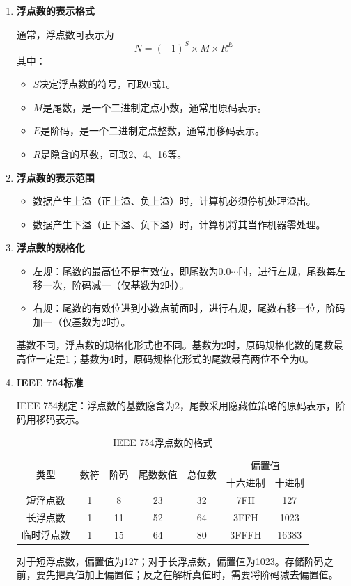 \documentclass[12pt, a4paper, oneside]{ctexart}
\begin{document}
\begin{enumerate}
  \item {\bf 浮点数的表示格式}
  
  通常，浮点数可表示为
  \begin{equation*}
    N=(-1)^S\times M\times R^E
  \end{equation*}
  其中：
  \begin{itemize}
    \item $S$决定浮点数的符号，可取0或1。
    \item $M$是尾数，是一个二进制定点小数，通常用原码表示。
    \item $E$是阶码，是一个二进制定点整数，通常用移码表示。
    \item $R$是隐含的基数，可取2、4、16等。
  \end{itemize}
  \item {\bf 浮点数的表示范围}
  
  \begin{itemize}
    \item 数据产生上溢（正上溢、负上溢）时，计算机必须停机处理溢出。
    \item 数据产生下溢（正下溢、负下溢）时，计算机将其当作机器零处理。
  \end{itemize}
  \item {\bf 浮点数的规格化}
  
  \begin{itemize}
    \item 左规：尾数的最高位不是有效位，即尾数为$0.0\cdots$时，进行左规，尾数每左移一次，阶码减一（仅基数为2时）。
    \item 右规：尾数的有效位进到小数点前面时，进行右规，尾数右移一位，阶码加一（仅基数为2时）。
  \end{itemize}

  基数不同，浮点数的规格化形式也不同。基数为2时，原码规格化数的尾数最高位一定是1；基数为4时，原码规格化形式的尾数最高两位不全为0。
  \item {\bf IEEE 754标准}
  
  IEEE 754规定：浮点数的基数隐含为2，尾数采用隐藏位策略的原码表示，阶码用移码表示。
  \begin{table}
    \centering
    \caption{IEEE 754浮点数的格式}
    \begin{tabular}{|c|c|c|c|c|c|c|}
      \hline
      \multirow{2}{*}{类型} & \multirow{2}{*}{数符} & \multirow{2}{*}{阶码} & \multirow{2}{*}{尾数数值} & \multirow{2}{*}{总位数} & \multicolumn{2}{|c|}{偏置值} \\ \cline{6-7}
      & & & & & 十六进制 & 十进制 \\ \hline
      短浮点数 & 1 & 8 & 23 & 32 & 7FH & 127 \\ \hline
      长浮点数 & 1 & 11 & 52 & 64 & 3FFH & 1023 \\ \hline
      临时浮点数 & 1 & 15 & 64 & 80 & 3FFFH & 16383 \\
      \hline
    \end{tabular}
  \end{table}
  对于短浮点数，偏置值为127；对于长浮点数，偏置值为1023。存储阶码之前，要先把真值加上偏置值；反之在解析真值时，需要将阶码减去偏置值。


\end{enumerate}
\end{document}
